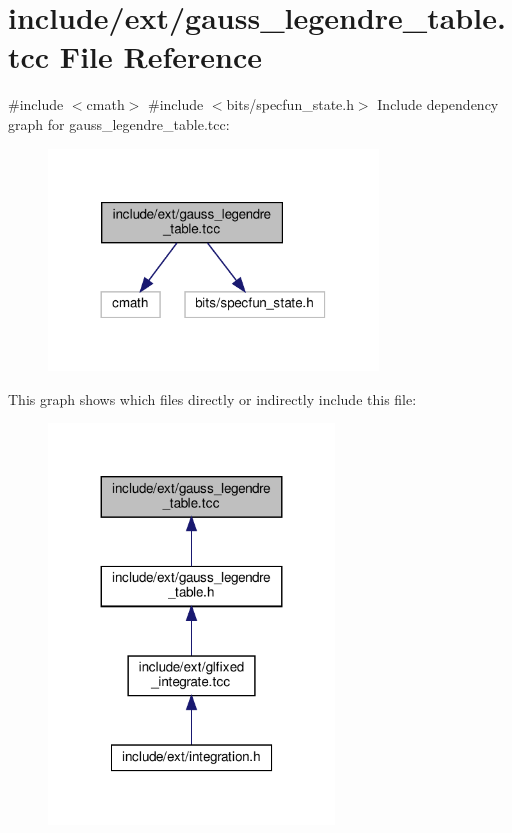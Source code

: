 \hypertarget{gauss__legendre__table_8tcc}{}\section{include/ext/gauss\+\_\+legendre\+\_\+table.tcc File Reference}
\label{gauss__legendre__table_8tcc}
{\ttfamily \#include $<$cmath$>$}\newline
{\ttfamily \#include $<$bits/specfun\+\_\+state.\+h$>$}\newline
Include dependency graph for gauss\+\_\+legendre\+\_\+table.\+tcc\+:
\nopagebreak
\begin{figure}[H]
\begin{center}
\leavevmode
\includegraphics[width=248pt]{gauss__legendre__table_8tcc__incl}
\end{center}
\end{figure}
This graph shows which files directly or indirectly include this file\+:
\nopagebreak
\begin{figure}[H]
\begin{center}
\leavevmode
\includegraphics[width=215pt]{gauss__legendre__table_8tcc__dep__incl}
\end{center}
\end{figure}
